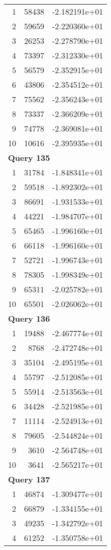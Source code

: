 \begin{longtable}[{p}]{@{}rrp{}@{}}
1 & 58438 & -2.182191e+01 \\
2 & 59659 & -2.220360e+01 \\
3 & 26253 & -2.278790e+01 \\
4 & 73397 & -2.312330e+01 \\
5 & 56579 & -2.352915e+01 \\
6 & 43806 & -2.354512e+01 \\
7 & 75562 & -2.356243e+01 \\
8 & 73337 & -2.366209e+01 \\
9 & 74778 & -2.369081e+01 \\
10 & 10616 & -2.395935e+01 \\
\midrule
\multicolumn{3}{l}{\bfseries Query 135} \\
1 & 31784 & -1.848341e+01 \\
2 & 59518 & -1.892302e+01 \\
3 & 86691 & -1.931533e+01 \\
4 & 44221 & -1.984707e+01 \\
5 & 65465 & -1.996160e+01 \\
6 & 66118 & -1.996160e+01 \\
7 & 52721 & -1.996743e+01 \\
8 & 78305 & -1.998349e+01 \\
9 & 65311 & -2.025782e+01 \\
10 & 65501 & -2.026062e+01 \\
\midrule
\multicolumn{3}{l}{\bfseries Query 136} \\
1 & 19488 & -2.467774e+01 \\
2 & 8768 & -2.472748e+01 \\
3 & 35104 & -2.495195e+01 \\
4 & 55797 & -2.512085e+01 \\
5 & 55914 & -2.513563e+01 \\
6 & 34428 & -2.521985e+01 \\
7 & 11114 & -2.524913e+01 \\
8 & 79605 & -2.544824e+01 \\
9 & 3610 & -2.564748e+01 \\
10 & 3641 & -2.565217e+01 \\
\midrule
\multicolumn{3}{l}{\bfseries Query 137} \\
1 & 46874 & -1.309477e+01 \\
2 & 66879 & -1.334155e+01 \\
3 & 49235 & -1.342792e+01 \\
4 & 61252 & -1.350758e+01 \\

\end{longtable}

